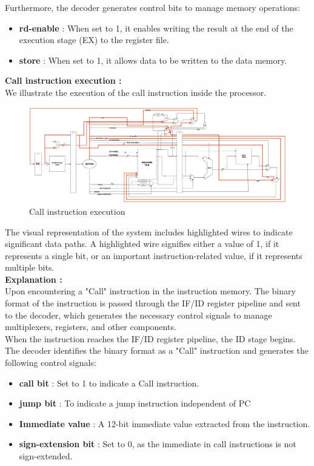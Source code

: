 \documentclass[a4paper,12pt]{article}
\begin{document}
Furthermore, the decoder generates control bits to manage memory operations:
\begin{itemize}
    \item \textbf{rd-enable} : When set to 1, it enables writing the result at the end of the execution stage (EX) to the register file.
    \item \textbf{store} : When set to 1, it allows data to be written to the data memory.
\end{itemize}

\textbf{Call instruction execution :}\\

We illustrate the execution of the call instruction inside the processor.

\begin{figure}[H]
    \centering
    \includegraphics[width=1\linewidth]{CALL_instruction.png}
    \caption{Call instruction execution}
    \label{fig:call-exe}
\end{figure}

The visual representation of the system includes highlighted wires to indicate significant data paths. A highlighted wire signifies either a value of 1, if it represents a single bit, or an important instruction-related value, if it represents multiple bits.\\

\textbf{Explanation :} \\

Upon encountering a "Call" instruction in the instruction memory. The binary format of the instruction is passed through the IF/ID register pipeline and sent to the decoder, which generates the necessary control signals to manage multiplexers, registers, and other components.\\

When the instruction reaches the IF/ID register pipeline, the ID stage begins. The decoder identifies the binary format as a "Call" instruction and generates the following control signals:
\begin{itemize}
    \item \textbf{call bit} : Set to 1 to indicate a Call instruction.
    \item \textbf{jump bit} : To indicate a jump instruction independent of PC
    \item \textbf{Immediate value} : A 12-bit immediate value extracted from the instruction.
    \item \textbf{sign-extension bit} : Set to 0, as the immediate in call instructions is not sign-extended.
\end{itemize}
\end{document}
